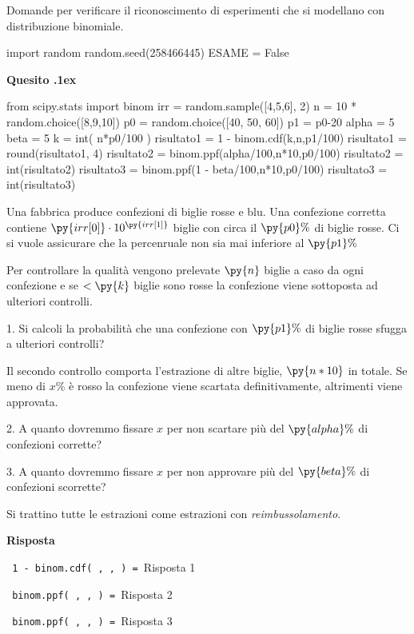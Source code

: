 \documentclass[11pt,twoside,a4paper]{article}
\newcounter{quesito}
\newenvironment{question}{\bigskip\addtocounter{quesito}{1}\bigskip\bigskip\par\textbf{Quesito \thequesito.\kern1ex}}{\vspace{\parskip}}
\newenvironment{answer}{\par\textbf{Risposta\quad}}{\vspace{\parskip}}
\begin{document}
\colorbox{blue!10}{\begin{minipage}{\textwidth}
Domande  per verificare il riconoscimento di esperimenti che si modellano con distribuzione binomiale.
\end{minipage}}

\bigskip\bigskip


\begin{pycode}
import random
random.seed(258466445)
ESAME = False
\end{pycode}


\begin{question}
\def\Pr{{\rm Pr\,}}
\def\Ex{{\rm E\,}}
\def\Var{{\rm Var\,}}
\begin{pycode}
from scipy.stats import binom
irr = random.sample([4,5,6], 2)
n = 10 * random.choice([8,9,10])
p0 = random.choice([40, 50, 60])
p1 = p0-20
alpha =  5
beta =  5
k = int( n*p0/100 )
risultato1 = 1 - binom.cdf(k,n,p1/100)
risultato1 = round(risultato1, 4)
risultato2 = binom.ppf(alpha/100,n*10,p0/100)
risultato2 = int(risultato2)
risultato3 = binom.ppf(1 - beta/100,n*10,p0/100)
risultato3 = int(risultato3)
\end{pycode}
Una fabbrica produce confezioni di biglie rosse e blu. Una confezione corretta contiene $\py{irr[0]}\cdot 10^{\py{irr[1]}}$ biglie con circa il $\py{p0}\%$ di biglie rosse. Ci si vuole assicurare che la percenruale non sia mai inferiore al $\py{p1}\%$

Per controllare la qualità vengono prelevate $\py{n}$ biglie a caso da ogni confezione e se $<\py{k}$ biglie sono rosse la confezione viene sottoposta ad ulteriori controlli.

1. Si calcoli la probabilità che una confezione con $\py{p1}\%$ di biglie rosse sfugga a ulteriori controlli?

Il secondo controllo comporta l'estrazione di altre biglie,  $\py{n*10}$ in totale. Se meno di $x\%$ è rosso la confezione viene scartata definitivamente, altrimenti viene approvata.


2. A quanto dovremmo fissare $x$ per non scartare più del $\py{alpha}\%$ di confezioni corrette?

3. A quanto dovremmo fissare $x$ per non approvare più del $\py{beta}\%$ di confezioni scorrette?

Si trattino tutte le estrazioni come estrazioni con \textit{reimbussolamento}.

\begin{answer}

{\tt {\color{blue} 1 - binom.cdf( , ,  )} = }\hfill  {\color{blue}Risposta 1}

{\tt {\color{blue} binom.ppf( , ,  )} = }\hfill  {\color{blue}Risposta 2}

{\tt {\color{blue} binom.ppf( , ,  )} = }\hfill {\color{blue}Risposta 3}

\end{answer}
\end{question}
\end{document}
